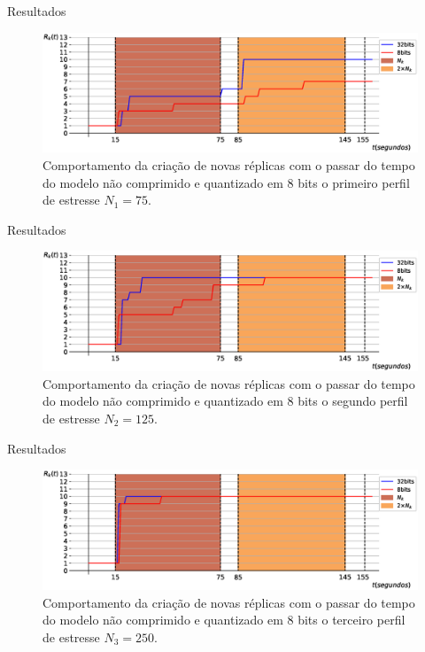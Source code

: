 \begin{frame}{Resultados}
    \begin{figure}[H]
    \centering
    \includegraphics[width=1\textwidth]{figuras/escalonamento.eps}
    \caption{Comportamento da criação de novas réplicas com o passar do tempo do modelo não comprimido e quantizado em $8$ bits o primeiro perfil de estresse $N_1=75$.}
    \end{figure}
\end{frame}

\begin{frame}{Resultados}
    \begin{figure}[H]
    \centering
    \includegraphics[width=1\textwidth]{figuras/escalonamento2.eps}
    \caption{Comportamento da criação de novas réplicas com o passar do tempo do modelo não comprimido e quantizado em $8$ bits o segundo perfil de estresse $N_2=125$.}
    \end{figure}
\end{frame}

\begin{frame}{Resultados}
    \begin{figure}[H]
    \centering
    \includegraphics[width=1\textwidth]{figuras/escalonamento3.eps}
    \caption{Comportamento da criação de novas réplicas com o passar do tempo do modelo não comprimido e quantizado em $8$ bits o terceiro perfil de estresse $N_3=250$.}
    \end{figure}
\end{frame}